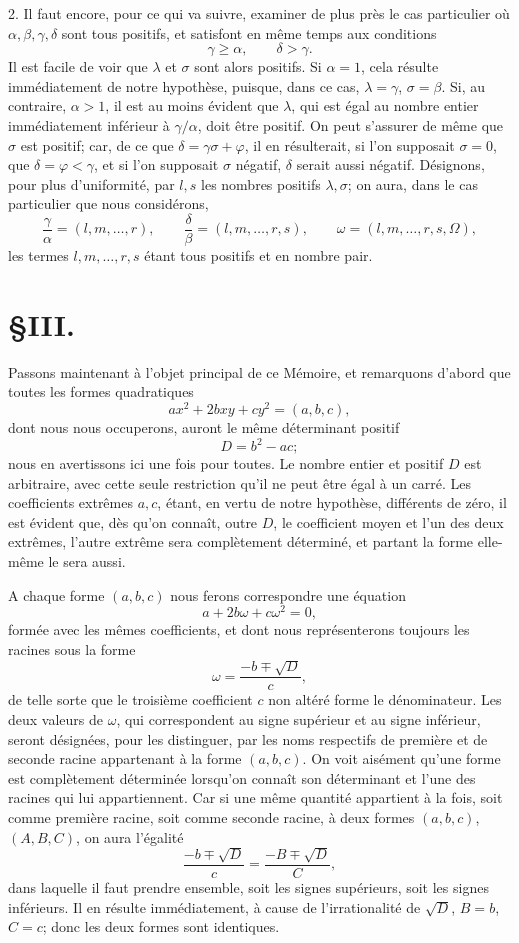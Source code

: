 \documentclass[11pt]{article}
\begin{document}
2. Il faut encore, pour ce qui va suivre, examiner de plus près le cas particulier où $\alpha,\beta,\gamma,\delta$ sont tous positifs, et satisfont en même temps aux conditions
\[
  \gamma\geq \alpha,\qquad \delta>\gamma.
\]
Il est facile de voir que $\lambda$ et $\sigma$ sont alors positifs. Si $\alpha=1$, cela résulte immédiatement de notre hypothèse, puisque, dans ce cas, $\lambda=\gamma$, $\sigma=\beta$. Si, au contraire, $\alpha>1$, il est au moins évident que $\lambda$, qui est égal au nombre entier immédiatement inférieur à $\gamma/\alpha$, doit être positif. On peut s'assurer de même que $\sigma$ est positif; car, de ce que $\delta=\gamma\sigma+\varphi$, il en résulterait, si l'on supposait $\sigma=0$, que $\delta=\varphi<\gamma$, et si l'on supposait $\sigma$ négatif, $\delta$ serait aussi négatif. Désignons, pour plus d'uniformité, par $l,s$ les nombres positifs $\lambda,\sigma$; on aura, dans le cas particulier que nous considérons,
\[
  \frac{\gamma}{\alpha}=(l,m,\ldots,r),\qquad
  \frac{\delta}{\beta}=(l,m,\ldots,r,s),\qquad
  \omega=(l,m,\ldots,r,s,\Omega),
\]
les termes $l,m,\ldots,r,s$ étant tous positifs et en nombre pair.

\section*{\S III.}

Passons maintenant à l'objet principal de ce Mémoire, et remarquons d'abord que toutes les formes quadratiques
\[
  ax^2+2bxy+cy^2=(a,b,c),
\]
dont nous nous occuperons, auront le même déterminant positif
\[
  D=b^2-ac;
\]
nous en avertissons ici une fois pour toutes. Le nombre entier et positif $D$ est arbitraire, avec cette seule restriction qu'il ne peut être égal à un carré. Les coefficients extrêmes $a,c$, étant, en vertu de notre hypothèse, différents de zéro, il est évident que, dès qu'on connaît, outre $D$, le coefficient moyen et l'un des deux extrêmes, l'autre extrême sera complètement déterminé, et partant la forme elle-même le sera aussi.

A chaque forme $(a,b,c)$ nous ferons correspondre une équation
\[
  a+2b\omega+c\omega^2=0,
\]
formée avec les mêmes coefficients, et dont nous représenterons toujours les racines sous la forme
\[
  \omega=\frac{-b\mp\sqrt D}{c},
\]
de telle sorte que le troisième coefficient $c$ non altéré forme le dénominateur. Les deux valeurs de $\omega$, qui correspondent au signe supérieur et au signe inférieur, seront désignées, pour les distinguer, par les noms respectifs de première et de seconde racine appartenant à la forme $(a,b,c)$. On voit aisément qu'une forme est complètement déterminée lorsqu'on connaît son déterminant et l'une des racines qui lui appartiennent. Car si une même quantité appartient à la fois, soit comme première racine, soit comme seconde racine, à deux formes $(a,b,c)$, $(A,B,C)$, on aura l'égalité
\[
 \frac{-b\mp\sqrt D}{c}=\frac{-B\mp\sqrt D}{C},
\]
dans laquelle il faut prendre ensemble, soit les signes supérieurs, soit les signes inférieurs. Il en résulte immédiatement, à cause de l'irrationalité de $\sqrt D$, $B=b$, $C=c$; donc les deux formes sont identiques.
\end{document}
